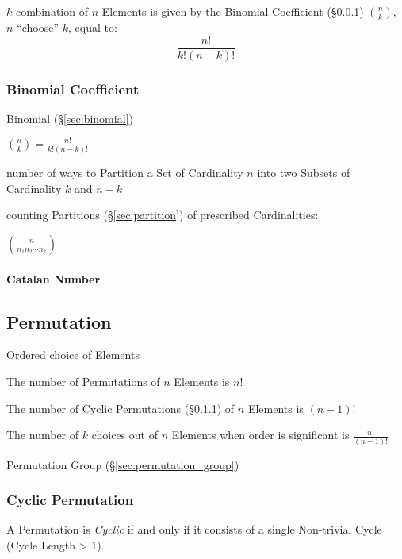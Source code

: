 $k$-combination of $n$ Elements is given by the Binomial Coefficient
(\S\ref{sec:binomial_coefficient}) $\binom{n}{k}$, $n$ ``choose'' $k$, equal to:
\[
  \frac{n!}{k!(n - k)!}
\]



\subsubsection{Binomial Coefficient}\label{sec:binomial_coefficient}

Binomial (\S\ref{sec:binomial})

$\binom{n}{k} = \frac{n!}{k!(n - k)!}$

number of ways to Partition a Set of Cardinality $n$ into two Subsets of
Cardinality $k$ and $n-k$

counting Partitions (\S\ref{sec:partition}) of prescribed Cardinalities:

$\binom{n}{n_1 n_2 \cdots n_k}$



\paragraph{Catalan Number}\label{sec:catalan_number}\hfill



\subsection{Permutation}\label{sec:permutation}

Ordered choice of Elements

The number of Permutations of $n$ Elements is $n!$

The number of Cyclic Permutations (\S\ref{sec:cyclic_permutation}) of $n$
Elements is $(n-1)!$

The number of $k$ choices out of $n$ Elements when order is significant is
$\frac{n!}{(n-1)!}$

Permutation Group (\S\ref{sec:permutation_group})



\subsubsection{Cyclic Permutation}\label{sec:cyclic_permutation}

A Permutation is \emph{Cyclic} if and only if it consists of a single
Non-trivial Cycle (Cycle Length > 1).



